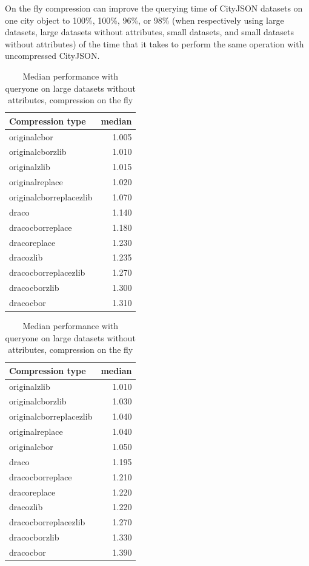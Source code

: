 On the fly compression can improve the querying time of CityJSON datasets on one city object to 100\%, 100\%, 96\%, or 98\% (when respectively using large datasets, large datasets without attributes, small datasets, and small datasets without attributes) of the time that it takes to perform the same operation with uncompressed CityJSON.


  \begin{table}[!h]
    \begin{minipage}{.5\linewidth}
      \caption{
Median performance with queryone on large datasets, compression on the fly}
\centering

\begin{tabular}{|l|r|}
\hline
Compression type & median\\
\hline
originalcbor & 1.005\\
\hline
originalcborzlib & 1.010\\
\hline
originalzlib & 1.015\\
\hline
originalreplace & 1.020\\
\hline
originalcborreplacezlib & 1.070\\
\hline
draco & 1.140\\
\hline
dracocborreplace & 1.180\\
\hline
dracoreplace & 1.230\\
\hline
dracozlib & 1.235\\
\hline
dracocborreplacezlib & 1.270\\
\hline
dracocborzlib & 1.300\\
\hline
dracocbor & 1.310\\
\hline
\end{tabular}
\end{minipage}%
    \begin{minipage}{.5\linewidth}
      \centering
        \caption{
Median performance with queryone on large datasets without attributes, compression on the fly}

\begin{tabular}{|l|r|}
\hline
Compression type & median\\
\hline
originalzlib & 1.010\\
\hline
originalcborzlib & 1.030\\
\hline
originalcborreplacezlib & 1.040\\
\hline
originalreplace & 1.040\\
\hline
originalcbor & 1.050\\
\hline
draco & 1.195\\
\hline
dracocborreplace & 1.210\\
\hline
dracoreplace & 1.220\\
\hline
dracozlib & 1.220\\
\hline
dracocborreplacezlib & 1.270\\
\hline
dracocborzlib & 1.330\\
\hline
dracocbor & 1.390\\
\hline
\end{tabular}
\end{minipage} 
\end{table}
